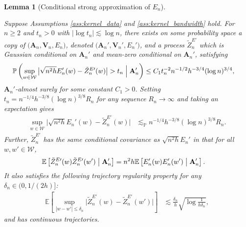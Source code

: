 \documentclass[11pt,lof]{puthesis}
\renewcommand{\P}{\ensuremath{\mathbb{P}}}
\newcommand{\E}{\ensuremath{\mathbb{E}}}
\newcommand{\bA}{\ensuremath{\mathbf{A}}}
\newcommand{\bV}{\ensuremath{\mathbf{V}}}
\newcommand{\cW}{\ensuremath{\mathcal{W}}}
\theoremstyle{break}
\newtheorem{lemma}{Lemma}[section]
\theoremstyle{proof}
\begin{document}
\begin{lemma}[Conditional strong approximation of $E_n$]
\label{lem:kernel_app_conditional_strong_approx_En}

Suppose Assumptions
\ref{ass:kernel_data} and \ref{ass:kernel_bandwidth} hold.
For $n \geq 2$
and $t_n > 0$ with $\left|\log t_n\right| \lesssim \log n$,
there exists on some probability space
a copy of
$\big(\bA_n, \bV_n, E_n\big)$,
denoted
$\big(\bA_n', \bV_n', E_n'\big)$,
and a process
$\tilde Z^{E\prime}_n$
which is Gaussian conditional on $\bA_n'$
and mean-zero conditional on $\bA_n'$,
satisfying
%
\begin{align*}
\P\left(
\sup_{w \in \cW}
\big|
\sqrt{n^2h} E_n'(w) - \tilde Z_n^{E\prime}(w)
\big|
> t_n
\Bigm\vert \bA_n'
\right)
&\leq
C_1
t_n^{-2}
n^{-1/2}
h^{-3/4}
(\log n)^{3/4},
\end{align*}
$\bA_n'$-almost surely
for some constant $C_1 > 0$.
Setting $t_n = n^{-1/4} h^{-3/8} (\log n)^{3/8} R_n$
for any sequence $R_n \to \infty$
and taking an expectation gives
%
\begin{align*}
\sup_{w \in \cW}
\big|
\sqrt{n^2h} E_n'(w) - \tilde Z_n^{E\prime}(w)
\big|
&\lesssim_\P
n^{-1/4}
h^{-3/8} (\log n)^{3/8} R_n.
\end{align*}
%
Further,
$\tilde Z_n^{E\prime}$ has the same conditional covariance as
$\sqrt{n^2h} E_n'$ in that for all $w, w' \in \cW$,
%
\begin{align*}
\E\left[
\tilde Z_n^{E\prime}(w)
\tilde Z_n^{E\prime}(w')
\bigm\vert \bA_n'
\right]
&=
n^2h
\E\left[
E_n'(w)
E_n'(w')
\bigm\vert \bA_n'
\right].
\end{align*}
%
It also satisfies the following
trajectory regularity property
for any $\delta_n \in (0, 1/(2h)]$:
%
\begin{align*}
\E\left[
\sup_{|w-w'| \leq \delta_n}
\big|
\tilde Z_n^{E\prime}(w)
- \tilde Z_n^{E\prime}(w')
\big|
\right]
&\lesssim
\frac{\delta_n}{h}
\sqrt{\log \frac{1}{h\delta_n}},
\end{align*}
%
and has continuous trajectories.

\end{lemma}
\end{document}
